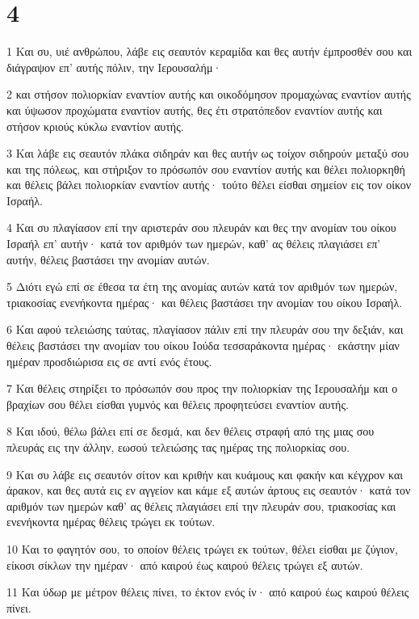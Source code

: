 \chapter{4}

\par 1 Και συ, υιέ ανθρώπου, λάβε εις σεαυτόν κεραμίδα και θες αυτήν έμπροσθέν σου και διάγραψον επ' αυτής πόλιν, την Ιερουσαλήμ·
\par 2 και στήσον πολιορκίαν εναντίον αυτής και οικοδόμησον προμαχώνας εναντίον αυτής και ύψωσον προχώματα εναντίον αυτής, θες έτι στρατόπεδον εναντίον αυτής και στήσον κριούς κύκλω εναντίον αυτής.
\par 3 Και λάβε εις σεαυτόν πλάκα σιδηράν και θες αυτήν ως τοίχον σιδηρούν μεταξύ σου και της πόλεως, και στήριξον το πρόσωπόν σου εναντίον αυτής και θέλει πολιορκηθή και θέλεις βάλει πολιορκίαν εναντίον αυτής· τούτο θέλει είσθαι σημείον εις τον οίκον Ισραήλ.
\par 4 Και συ πλαγίασον επί την αριστεράν σου πλευράν και θες την ανομίαν του οίκου Ισραήλ επ' αυτήν· κατά τον αριθμόν των ημερών, καθ' ας θέλεις πλαγιάσει επ' αυτήν, θέλεις βαστάσει την ανομίαν αυτών.
\par 5 Διότι εγώ επί σε έθεσα τα έτη της ανομίας αυτών κατά τον αριθμόν των ημερών, τριακοσίας ενενήκοντα ημέρας· και θέλεις βαστάσει την ανομίαν του οίκου Ισραήλ.
\par 6 Και αφού τελειώσης ταύτας, πλαγίασον πάλιν επί την πλευράν σου την δεξιάν, και θέλεις βαστάσει την ανομίαν του οίκου Ιούδα τεσσαράκοντα ημέρας· εκάστην μίαν ημέραν προσδιώρισα εις σε αντί ενός έτους.
\par 7 Και θέλεις στηρίξει το πρόσωπόν σου προς την πολιορκίαν της Ιερουσαλήμ και ο βραχίων σου θέλει είσθαι γυμνός και θέλεις προφητεύσει εναντίον αυτής.
\par 8 Και ιδού, θέλω βάλει επί σε δεσμά, και δεν θέλεις στραφή από της μιας σου πλευράς εις την άλλην, εωσού τελειώσης τας ημέρας της πολιορκίας σου.
\par 9 Και συ λάβε εις σεαυτόν σίτον και κριθήν και κυάμους και φακήν και κέγχρον και άρακον, και θες αυτά εις εν αγγείον και κάμε εξ αυτών άρτους εις σεαυτόν· κατά τον αριθμόν των ημερών καθ' ας θέλεις πλαγιάσει επί την πλευράν σου, τριακοσίας και ενενήκοντα ημέρας θέλεις τρώγει εκ τούτων.
\par 10 Και το φαγητόν σου, το οποίον θέλεις τρώγει εκ τούτων, θέλει είσθαι με ζύγιον, είκοσι σίκλων την ημέραν· από καιρού έως καιρού θέλεις τρώγει εξ αυτών.
\par 11 Και ύδωρ με μέτρον θέλεις πίνει, το έκτον ενός ίν· από καιρού έως καιρού θέλεις πίνει.
